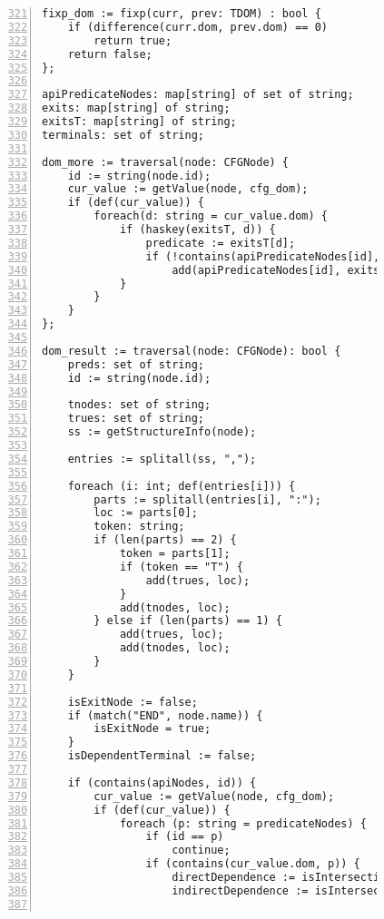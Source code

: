 \begin{figure}[ht!]
\begin{lstlisting}[numbers=left, tabsize=4, escapechar=@, caption={API Usage Mining Analysis},label={lst:aun-code},  firstline = 321, firstnumber = 321, lastline = 381]
fixp_dom := fixp(curr, prev: TDOM) : bool {
 	if (difference(curr.dom, prev.dom) == 0)
 		return true;	
 	return false;
};

apiPredicateNodes: map[string] of set of string;
exits: map[string] of string;
exitsT: map[string] of string;
terminals: set of string;

dom_more := traversal(node: CFGNode) {
    id := string(node.id);
    cur_value := getValue(node, cfg_dom);
    if (def(cur_value)) {
        foreach(d: string = cur_value.dom) {
            if (haskey(exitsT, d)) {
                predicate := exitsT[d];  
                if (!contains(apiPredicateNodes[id], predicate))
                    add(apiPredicateNodes[id], exits[d]);
            }
        }
    }
};

dom_result := traversal(node: CFGNode): bool {
    preds: set of string;
    id := string(node.id);
    
    tnodes: set of string;
    trues: set of string;
    ss := getStructureInfo(node);
    
    entries := splitall(ss, ",");
    
    foreach (i: int; def(entries[i])) {
    	parts := splitall(entries[i], ":"); 
    	loc := parts[0]; 
    	token: string;
    	if (len(parts) == 2) {
    	    token = parts[1];
    		if (token == "T") {
    		    add(trues, loc);    
    		}
            add(tnodes, loc);
    	} else if (len(parts) == 1) {
    	    add(trues, loc);  
    		add(tnodes, loc);
    	}
    }
    
    isExitNode := false;
    if (match("END", node.name)) {
        isExitNode = true;
    }
    isDependentTerminal := false;

    if (contains(apiNodes, id)) {
        cur_value := getValue(node, cfg_dom);
        if (def(cur_value)) {
            foreach (p: string = predicateNodes) {
                if (id == p)
                    continue;
                if (contains(cur_value.dom, p)) {
                    directDependence := isIntersectionNotNull(variables[id], variables[p]);
                    indirectDependence := isIntersectionNotNull(allVars, variables[p]);
                    

\end{lstlisting}
\end{figure}
